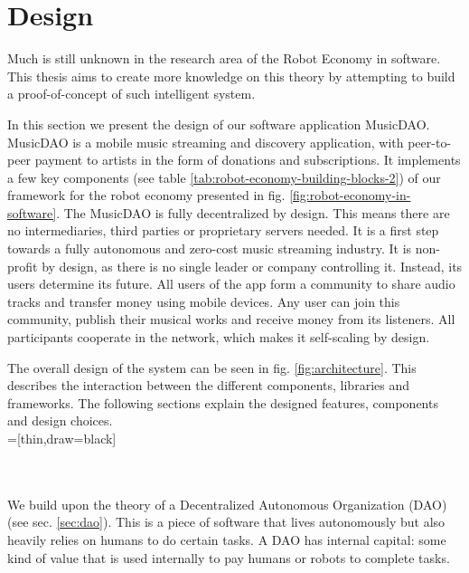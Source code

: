 \chapter{Design}
\label{chap:design}
Much is still unknown in the research area of the Robot Economy in software. This thesis aims to create more knowledge on this theory by attempting to build a proof-of-concept of such intelligent system.

In this section we present the design of our software application MusicDAO. MusicDAO is a mobile music streaming and discovery application, with peer-to-peer payment to artists in the form of donations and subscriptions. It implements a few key components (see table \ref{tab:robot-economy-building-blocks-2}) of our framework for the robot economy presented in fig. \ref{fig:robot-economy-in-software}. The MusicDAO is fully decentralized by design. This means there are no intermediaries, third parties or proprietary servers needed. It is a first step towards a fully autonomous and zero-cost music streaming industry. It is non-profit by design, as there is no single leader or company controlling it. Instead, its users determine its future. All users of the app form a community to share audio tracks and transfer money using mobile devices. Any user can join this community, publish their musical works and receive money from its listeners. All participants cooperate in the network, which makes it self-scaling by design.

The overall design of the system can be seen in fig. \ref{fig:architecture}. This describes the interaction between the different components, libraries and frameworks. The following sections explain the designed features, components and design choices.
\\

=[thin,draw=black]
\\
\\
We build upon the theory of a Decentralized Autonomous Organization (DAO) (see sec. \ref{sec:dao}). This is a piece of software that lives autonomously but also heavily relies on humans to do certain tasks. A DAO has internal capital: some kind of value that is used internally to pay humans or robots to complete tasks.

